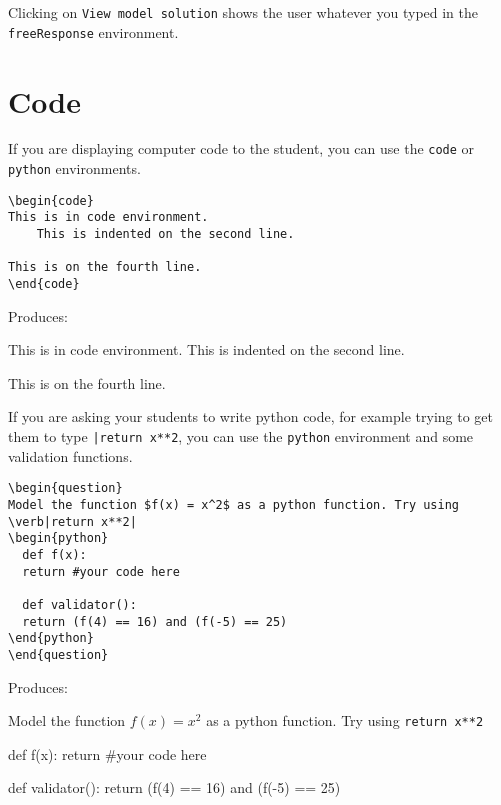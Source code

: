 \documentclass{ximera}
\begin{document}
\begin{remark}
Clicking on \verb!View model solution! shows the user
whatever you typed in the  \verb!freeResponse! environment.
\end{remark}


\section{Code}

If you are displaying computer code to the student, you can use the \verb!code! or \verb!python! environments.

\begin{verbatim}
\begin{code}
This is in code environment.
    This is indented on the second line.

This is on the fourth line.
\end{code}
\end{verbatim}

Produces:

\begin{code}
This is in code environment.
    This is indented on the second line.

This is on the fourth line.
\end{code}

If you are asking your students to write python code, for example trying to get them to type \verb!|return x**2!, you can use the \verb!python! environment and some validation functions.

\begin{verbatim}
\begin{question}
Model the function $f(x) = x^2$ as a python function. Try using \verb|return x**2|
\begin{python}
  def f(x):
  return #your code here

  def validator():
  return (f(4) == 16) and (f(-5) == 25)
\end{python}
\end{question}
\end{verbatim}

Produces:

\begin{question}
Model the function $f(x) = x^2$ as a python function. Try using \verb|return x**2|
\begin{python}
  def f(x):
  return #your code here

  def validator():
  return (f(4) == 16) and (f(-5) == 25)
\end{python}
\end{question}
\end{document}
